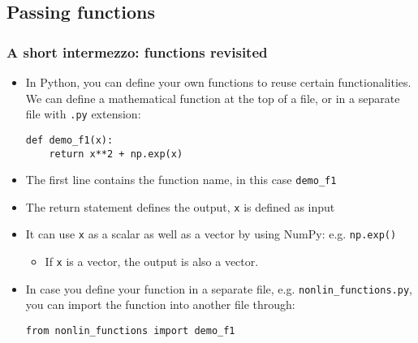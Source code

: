 \subsection*{Passing functions}
\begin{frame}[fragile]
  \frametitle{A short intermezzo: functions revisited}
  \begin{itemize}
    \item In Python, you can define your own functions to reuse certain functionalities. We can define a mathematical function at the top of a file, or in a separate file with \lstinline|.py| extension:
          \begin{lstlisting}
def demo_f1(x):
    return x**2 + np.exp(x)
      \end{lstlisting}
    \item The first line contains the function name, in this case \lstinline|demo_f1|
    \item The return statement defines the output, \lstinline|x| is defined as input
    \item It can use \lstinline|x| as a scalar as well as a vector by using NumPy: e.g. \lstinline|np.exp()|
    \begin{itemize}
      \item If \lstinline|x| is a vector, the output is also a vector.
    \end{itemize}
    \item In case you define your function in a separate file, e.g. \lstinline|nonlin_functions.py|, you can import the function into another file through:
    \begin{lstlisting}
from nonlin_functions import demo_f1
    \end{lstlisting}
  \end{itemize}
\end{frame}


